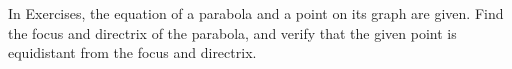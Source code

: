 \begin{exerciseset}{In Exercises}{, the equation of a parabola and a point on its graph are given. Find the focus and directrix of the parabola, and verify that the given point is equidistant from the focus and directrix.}



\end{exerciseset}
